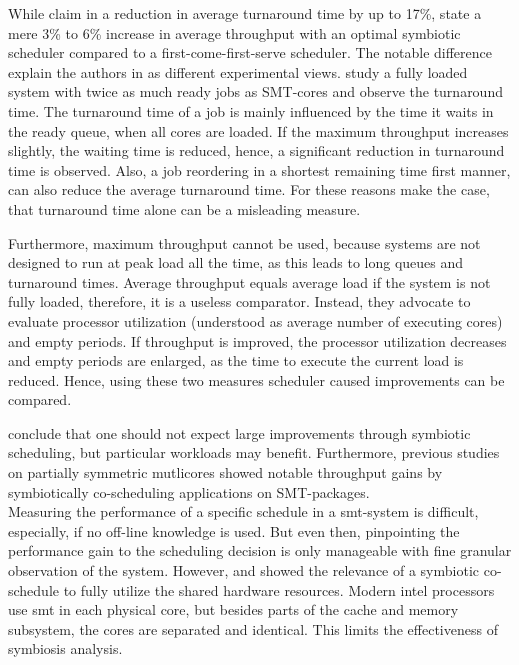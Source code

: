 While \citeauthor{snavely_symbiotic_2000} claim in
\cite{snavely_symbiotic_2000} a reduction in average turnaround time by up to
17\%, \citeauthor{eyerman_revisiting_2015} state a mere 3\% to 6\% increase in
average throughput with an optimal symbiotic scheduler compared to a
first-come-first-serve scheduler.
The notable difference explain the authors in \cite{eyerman_revisiting_2015} as
different experimental views. \citeauthor{snavely_symbiotic_2000} study a fully
loaded system with twice as much ready jobs as SMT-cores and observe the
turnaround time.
The turnaround time of a job is mainly influenced by the time it waits in the
ready queue, when all cores are loaded.
If the maximum throughput increases slightly, the waiting time is reduced,
hence, a significant reduction in turnaround time is observed.
Also, a job reordering in a shortest remaining time first manner, can also
reduce the average turnaround time.
For these reasons \citeauthor{eyerman_revisiting_2015} make the case,
that turnaround time alone can be a misleading measure.

Furthermore, maximum throughput cannot be used, because systems are not
designed to run at peak load all the time, as this leads to long queues and
turnaround times.
Average throughput equals average load if the system is not fully loaded,
therefore, it is a useless comparator.
Instead, they advocate to evaluate processor utilization (understood as average
number of executing cores) and empty periods.
If throughput is improved, the processor utilization decreases and empty
periods are enlarged, as the time to execute the current load is reduced.
Hence, using these two measures scheduler caused improvements can be compared.

\citeauthor{eyerman_revisiting_2015} conclude that one should not expect large
improvements through symbiotic scheduling, but particular workloads may benefit.
Furthermore, previous studies on partially symmetric mutlicores showed
notable throughput gains by symbiotically co-scheduling applications on
SMT-packages.
\\

Measuring the performance of a specific schedule in a \gls{smt}-system is
difficult, especially, if no off-line knowledge is used.
But even then, pinpointing the performance gain to the scheduling decision is
only manageable with fine granular observation of the system.
However, \cite{snavely_symbiotic_2000} and \cite{eyerman_revisiting_2015}
showed the relevance of a symbiotic co-schedule to fully utilize the shared
hardware resources.
Modern \gls{intel} processors use \gls{smt} in each physical core, but besides
parts of the cache and memory subsystem, the cores are separated and
identical.
This limits the effectiveness of symbiosis analysis.
\\

